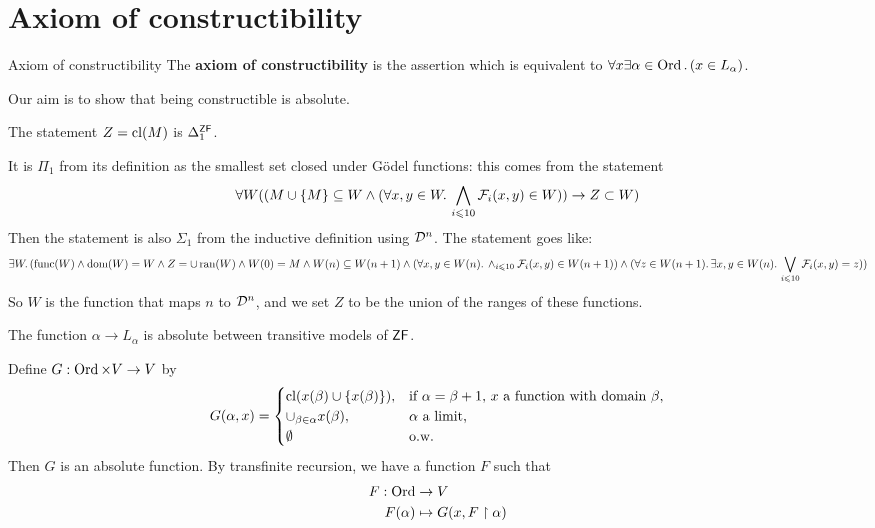 \documentclass{article}
\begin{document}
\section{Axiom of constructibility}
\begin{fancydefine}{Axiom of constructibility}
    The \textbf{axiom of constructibility} is the assertion  which is equivalent to $\forall x \exists \alpha \in \operatorname{Ord}. \, (x \in L_{\alpha})$.
\end{fancydefine}
Our aim is to show that being constructible is absolute.
\begin{fancylem}{}
    The statement $Z = \operatorname{cl}(M)$ is $\Delta_{1}^{\mathsf{ZF}}$.
\end{fancylem}
\proof It is $\Pi_{1}$ from its definition as the smallest set closed under G\"odel functions: this comes from the statement \[ \forall W ((M \cup \{M\} \subseteq W \wedge (\forall x,y \in W. \, \bigwedge_{i\leqslant 10} \mathcal{F}_{i}(x,y) \in W )) \rightarrow Z \subset W)\]
Then the statement is also $\Sigma_{1}$ from the inductive definition using $\mathcal{D}^{n}$. The statement goes like: \begin{align*}
    \exists W. \, (\operatorname{func}(W) \wedge \operatorname{dom}(W)=W \wedge Z = \cup\operatorname{ran}(W) \wedge W(0)=M \wedge W(n) \subseteq W(n+1) \wedge (\forall x,y \in W(n).\, \wedge_{i \leqslant 10} \mathcal{F}_{i}(x,y) \in W(n+1)) \wedge (\forall z \in W(n+1). \, \exists x,y \in W(n). \, \bigvee_{i \leqslant 10} \mathcal{F}_{i}(x,y) = z))
\end{align*}
So $W$ is the function that maps $n$ to $\mathcal{D}^{n}$, and we set $Z$ to be the union of the ranges of these functions.
\endproof
\begin{fancylem}{}
    The function $\alpha \to L_{\alpha}$ is absolute between transitive models of $\mathsf{ZF}$.
\end{fancylem}
\proof Define $G: \operatorname{Ord} \times V \to V$ by \[ G(\alpha,x) = \begin{cases}
        \operatorname{cl}(x(\beta) \cup \{x(\beta)\}),  & \text{if $\alpha = \beta +1$, $x$ a function with domain $\beta$,} \\
        \cup_{\beta \in \alpha} x(\beta), & \text{$\alpha$ a limit,}                                           \\
        \emptyset                         & \text{o.w.}
    \end{cases}\]
Then $G$ is an absolute function. By transfinite recursion, we have a function $F$ such that \begin{align*}
    F : \operatorname{Ord}  & \to V                                  \\
    F(\alpha) & \mapsto G(x, F \upharpoonright \alpha)
\end{align*}
\end{document}
